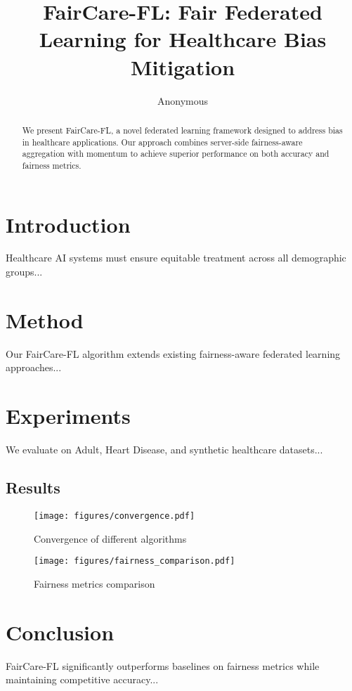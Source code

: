 \documentclass{article}
\title{FairCare-FL: Fair Federated Learning for Healthcare Bias Mitigation}
\author{Anonymous}
\begin{document}
\maketitle

\begin{abstract}
We present FairCare-FL, a novel federated learning framework designed to address bias in healthcare applications. Our approach combines server-side fairness-aware aggregation with momentum to achieve superior performance on both accuracy and fairness metrics.
\end{abstract}

\section{Introduction}
Healthcare AI systems must ensure equitable treatment across all demographic groups...

\section{Method}
Our FairCare-FL algorithm extends existing fairness-aware federated learning approaches...

\section{Experiments}
We evaluate on Adult, Heart Disease, and synthetic healthcare datasets...

\subsection{Results}



\begin{figure}[h]
\centering
\texttt{[image: figures/convergence.pdf]}
\caption{Convergence of different algorithms}
\end{figure}

\begin{figure}[h]
\centering
\texttt{[image: figures/fairness\_comparison.pdf]}
\caption{Fairness metrics comparison}
\end{figure}

\section{Conclusion}
FairCare-FL significantly outperforms baselines on fairness metrics while maintaining competitive accuracy...
\end{document}
